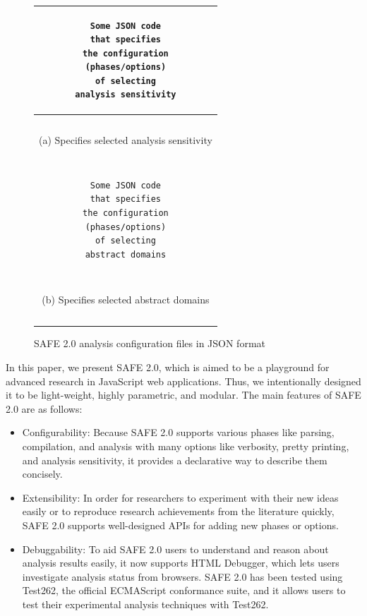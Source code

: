 \documentclass[10pt, conference]{IEEEtran}
\newcommand{\safe}{{SAFE 2.0}\xspace}
\newcommand{\htmldebug}{{\sf\small HTML Debugger}\xspace}
\begin{document}
\setcounter{figure}{0}
\begin{figure}[t]
\centering
\begin{tabular}{|c|}\hline
\begin{minipage}{.3\textwidth}
\footnotesize
\begin{verbatim}
Some JSON code
that specifies
the configuration
(phases/options)
of selecting
analysis sensitivity
\end{verbatim}
\end{minipage}
\\\hline
\multicolumn{1}{c}{~}\\[-.7em]
\multicolumn{1}{c}{\small (a) Specifies selected analysis sensitivity}\\
\multicolumn{1}{c}{~}\\[-.7em]
\hline
\begin{minipage}{.3\textwidth}
\footnotesize
\begin{verbatim}
Some JSON code
that specifies
the configuration
(phases/options)
of selecting
abstract domains
\end{verbatim}
\end{minipage}\\\hline
\multicolumn{1}{c}{~}\\[-.7em]
\multicolumn{1}{c}{\small (b) Specifies selected abstract domains}\\
\multicolumn{1}{c}{~}\\[-.7em]
\end{tabular}
\caption{\small \safe analysis configuration files in JSON format}
\label{fig:configurability}
\end{figure}


In this paper, we present \safe, which is aimed to be a playground
for advanced research in JavaScript web applications.  Thus, we
intentionally designed it to be light-weight, highly parametric,
and modular.  The main features of \safe are as follows:
\begin{itemize}
\item Configurability: Because \safe supports various phases
like parsing, compilation, and analysis with many options like
verbosity, pretty printing, and analysis sensitivity, it provides
a declarative way to describe them concisely.

\item Extensibility: In order for researchers to experiment with their
new ideas easily or to reproduce research achievements from the
literature quickly, \safe supports well-designed APIs for adding new
phases or options.

\item Debuggability: To aid \safe users to understand and reason about
analysis results easily, it now supports \htmldebug, which lets users
investigate analysis status from browsers.  \safe has been tested using
Test262, the official ECMAScript conformance suite, and it allows users
to test their experimental analysis techniques with Test262.
\end{itemize}
\end{document}
